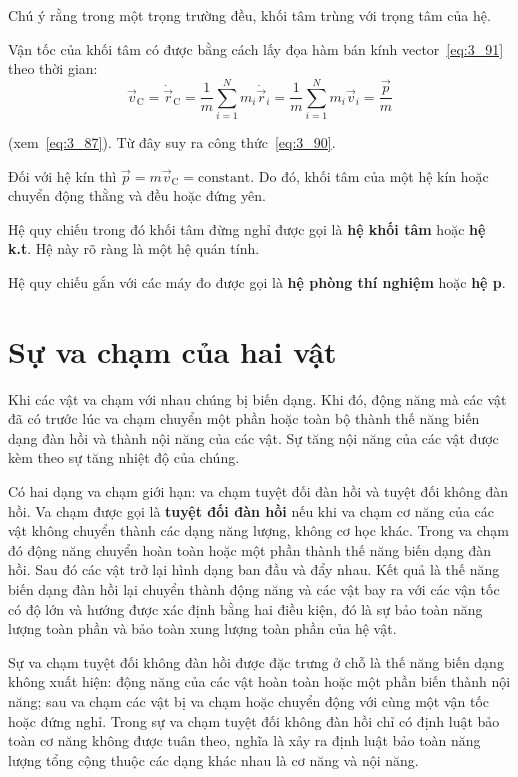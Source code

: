 \noindent
Chú ý rằng trong một trọng trường đều, khối tâm trùng với trọng tâm của hệ.

Vận tốc của khối tâm có được bằng cách lấy đọa hàm bán kính vector~\eqref{eq:3_91} theo thời gian:
\begin{equation*}
\vec{v}_{\text{C}} = \dot{\vec{r}}_{\text{C}} = \frac{1}{m}\sum_{i=1}^N m_i\dot{\vec{r}}_i = \frac{1}{m} \sum_{i=1}^N m_i\vec{v}_i = \frac{\vec{p}}{m}
\end{equation*}

\noindent
(xem~\eqref{eq:3_87}). Từ đây suy ra công thức~\eqref{eq:3_90}.

Đối với hệ kín thì $\vec{p}=m\vec{v}_{\text{C}}=\text{constant}$. Do đó, khối tâm của một hệ kín hoặc chuyển động thằng và đều hoặc đứng yên.

Hệ quy chiếu trong đó khối tâm đừng nghỉ được gọi là \textbf{hệ khối tâm} hoặc \textbf{hệ k.t}. Hệ này rõ ràng là một hệ quán tính.

Hệ quy chiếu gắn với các máy đo được gọi là \textbf{hệ phòng thí nghiệm} hoặc \textbf{hệ p}.

\section{Sự va chạm của hai vật}\label{sec:3_11}

Khi các vật va chạm với nhau chúng bị biến dạng. Khi đó, động năng mà các vật đã có trước lúc va chạm chuyển một phần hoặc toàn bộ thành thế năng biến dạng đàn hồi và thành nội năng của các vật. Sự tăng nội năng của các vật được kèm theo sự tăng nhiệt độ của chúng.

Có hai dạng va chạm giới hạn: va chạm tuyệt đối đàn hồi và tuyệt đối không đàn hồi. Va chạm được gọi là \textbf{tuyệt đối đàn hồi} nếu khi va chạm cơ năng của các vật không chuyển thành các dạng năng lượng, không cơ học khác. Trong va chạm đó động năng chuyển hoàn toàn hoặc một phần thành thế năng biến dạng đàn hồi. Sau đó các vật trở lại hình dạng ban đầu và đẩy nhau. Kết quả là thế năng biến dạng đàn hồi lại chuyển thành động năng và các vật bay ra với các vận tốc có độ lớn và hướng được xác định bằng hai điều kiện, đó là sự bảo toàn năng lượng toàn phần và bảo toàn xung lượng toàn phần của hệ vật.

Sự va chạm tuyệt đối không đàn hồi được đặc trưng ở chỗ là thế năng biến dạng không xuất hiện: động năng của các vật hoàn toàn hoặc một phần biến thành nội năng; sau va chạm các vật bị va chạm hoặc chuyển động với cùng một vận tốc hoặc đứng nghỉ. Trong sự va chạm tuyệt đối không đàn hồi chỉ có định luật bảo toàn cơ năng không được tuân theo, nghĩa là xảy ra định luật bảo toàn năng lượng tổng cộng thuộc các dạng khác nhau là cơ năng và nội năng. 

